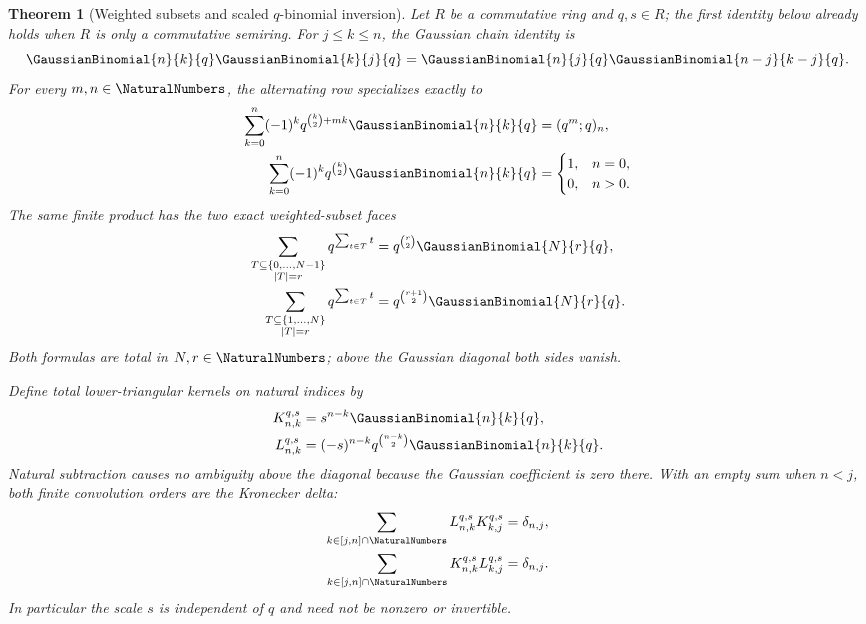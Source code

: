 \documentclass[11pt,oneside]{article}
\newtheorem{theorem}{Theorem}[section]
\theoremstyle{definition}
\theoremstyle{remark}
\begin{document}
\begin{theorem}[Weighted subsets and scaled $q$-binomial inversion]
\label{thm:q-binomial-inversion-formal}
Let \(R\) be a commutative ring and \(q,s\in R\); the first identity below
already holds when \(R\) is only a commutative semiring.  For
\(j\le k\le n\), the Gaussian chain identity is
\begin{equation}
 \GaussianBinomial{n}{k}{q}\GaussianBinomial{k}{j}{q}
 =\GaussianBinomial{n}{j}{q}\GaussianBinomial{n-j}{k-j}{q}.                     \label{eq:q-gaussian-chain}
\end{equation}
For every \(m,n\in\NaturalNumbers\), the alternating row specializes exactly to
\begin{align}
 \sum_{k=0}^{n}(-1)^kq^{\binom k2+mk}\GaussianBinomial{n}{k}{q}
   &=(q^m;q)_n,                                         \label{eq:q-alternating-general}\\
 \sum_{k=0}^{n}(-1)^kq^{\binom k2}\GaussianBinomial{n}{k}{q}
   &=\begin{cases}1,&n=0,\\0,&n>0.\end{cases}          \label{eq:q-alternating-delta}
\end{align}
The same finite product has the two exact weighted-subset faces
\begin{align}
 \sum_{\substack{T\subseteq\{0,\ldots,N-1\}\\|T|=r}}
   q^{\sum_{t\in T}t}
   &=q^{\binom r2}\GaussianBinomial{N}{r}{q},                        \label{eq:q-subsets-zero-based}\\
 \sum_{\substack{T\subseteq\{1,\ldots,N\}\\|T|=r}}
   q^{\sum_{t\in T}t}
   &=q^{\binom{r+1}{2}}\GaussianBinomial{N}{r}{q}.                  \label{eq:q-subsets-one-based}
\end{align}
Both formulas are total in \(N,r\in\NaturalNumbers\); above the Gaussian diagonal both
sides vanish.

Define total lower-triangular kernels on natural indices by
\begin{align}
 K^{q,s}_{n,k}&=s^{n-k}\GaussianBinomial{n}{k}{q},\label{eq:q-scaled-forward-kernel}\\
 L^{q,s}_{n,k}&=(-s)^{n-k}q^{\binom{n-k}{2}}\GaussianBinomial{n}{k}{q}.
                                                        \label{eq:q-scaled-inverse-kernel}
\end{align}
Natural subtraction causes no ambiguity above the diagonal because the
Gaussian coefficient is zero there.  With an empty sum when \(n<j\), both
finite convolution orders are the Kronecker delta:
\begin{align}
 \sum_{k\in [j,n]\cap\NaturalNumbers}L^{q,s}_{n,k}K^{q,s}_{k,j}
   &=\delta_{n,j},                                      \label{eq:q-scaled-left-delta}\\
 \sum_{k\in [j,n]\cap\NaturalNumbers}K^{q,s}_{n,k}L^{q,s}_{k,j}
   &=\delta_{n,j}.                                      \label{eq:q-scaled-right-delta}
\end{align}
In particular the scale \(s\) is independent of \(q\) and need not be
nonzero or invertible.


\end{theorem}
\end{document}
